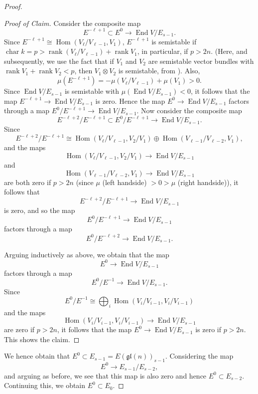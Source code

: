 \documentclass[12pt]{article}
\begin{document}
\begin{proof}
\begin{proof}[Proof of Claim]
Consider the composite map
\[
E^{-\ell+1} \subset E^0 \to \operatorname{End} V/E_{s-1}.
\]
Since $E^{-\ell+1} \cong \operatorname{Hom}(V_\ell/V_{\ell-1}, V_1)$, $E^{-\ell+1}$ is semistable if $\operatorname{char} k = p > \operatorname{rank}(V_\ell/V_{\ell-1}) + \operatorname{rank} V_1$, in particular, if $p > 2n$. (Here, and subsequently, we use the fact that if $V_1$ and $V_2$ are semistable vector bundles with $\operatorname{rank} V_1 + \operatorname{rank} V_2 < p$, then $V_1 \otimes V_2$ is semistable, from \cite{imp}). Also,
\[
\mu(E^{-\ell+1}) = -\mu(V_\ell/V_{\ell-1}) + \mu(V_1) > 0.
\]
Since $\operatorname{End} V/E_{s-1}$ is semistable with $\mu(\operatorname{End} V/E_{s-1}) < 0$, it follows that the map $E^{-\ell+1} \to \operatorname{End} V/E_{s-1}$ is zero. Hence the map $E^0 \to \operatorname{End} V/E_{s-1}$ factors through a map $E^0/E^{-\ell+1} \to \operatorname{End} V/E_{s-1}$. Now consider the composite map
\[
E^{-\ell+2}/E^{-\ell+1} \subset E^0/E^{-\ell+1} \to \operatorname{End} V/E_{s-1}.
\]
Since
\[
E^{-\ell+2}/E^{-\ell+1} \cong \operatorname{Hom}(V_\ell/V_{\ell-1}, V_2/V_1) \oplus \operatorname{Hom}(V_{\ell-1}/V_{\ell-2}, V_1),
\]
and the maps
\[
\operatorname{Hom}(V_\ell/V_{\ell-1}, V_2/V_1) \to \operatorname{End} V/E_{s-1}
\]
and
\[
\operatorname{Hom}(V_{\ell-1}/V_{\ell-2}, V_1) \to \operatorname{End} V/E_{s-1}
\]
are both zero if $p > 2n$ (since $\mu$ (left handside) $> 0 > \mu$ (right handside)), it follows that
\[
E^{-\ell+2}/E^{-\ell+1} \to \operatorname{End} V/E_{s-1}
\]
is zero, and so the map
\[
E^0/E^{-\ell+1} \to \operatorname{End} V/E_{s-1}
\]
factors through a map
\[
E^0 / E^{-\ell+2} \to \operatorname{End} V/E_{s-1}.
\]

Arguing inductively as above, we obtain that the map
\[
E^0 \to \operatorname{End} V/E_{s-1}
\]
factors through a map
\[
E^0 / E^{-1} \to \operatorname{End} V/E_{s-1}.
\]
Since
\[
E^0 / E^{-1} \cong \bigoplus_i \operatorname{Hom}(V_i/V_{i-1}, V_i/V_{i-1})
\]
and the maps
\[
\operatorname{Hom}(V_i/V_{i-1}, V_i/V_{i-1}) \to \operatorname{End} V/E_{s-1}
\]
are zero if $p > 2n$, it follows that the map $E^0 \to \operatorname{End} V/E_{s-1}$ is zero if $p > 2n$. This shows the claim.
\end{proof}

We hence obtain that $E^0 \subset E_{s-1} = E(\mathfrak{gl}(n))_{s-1}$. Considering the map
\[
E^0 \to E_{s-1}/E_{s-2},
\]
and arguing as before, we see that this map is also zero and hence $E^0 \subset E_{s-2}$. Continuing this, we obtain $E^0 \subset E_0$.


\end{proof}
\end{document}
